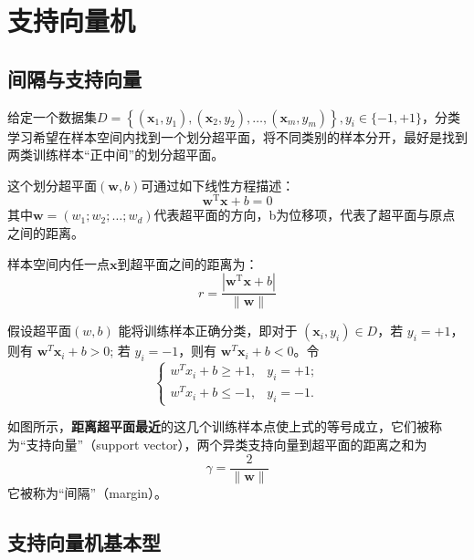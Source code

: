\chapter{支持向量机}

\section{间隔与支持向量}\label{sec:4.1}

给定一个数据集$
D=\left\{\left(\boldsymbol{x}_{1}, y_{1}\right),\left(\boldsymbol{x}_{2}, y_{2}\right), \ldots,\left(\boldsymbol{x}_{m}, y_{m}\right)\right\}, y_{i} \in\{-1,+1\}$，分类学习希望在样本空间内找到一个划分超平面，将不同类别的样本分开，最好是找到两类训练样本“正中间”的划分超平面。


这个划分超平面$(\boldsymbol w, b )$可通过如下线性方程描述：\[
\boldsymbol{w}^\mathrm{T}\boldsymbol{x}+b = 0
\]其中$ \boldsymbol{w}=\left(w_{1} ; w_{2} ; \ldots ; w_{d}\right) $代表超平面的方向，b为位移项，代表了超平面与原点之间的距离。

样本空间内任一点$\boldsymbol x$到超平面之间的距离为：\[
r=\frac{\left|\boldsymbol{w}^{\mathrm{T}} \boldsymbol{x}+b\right|}{\|\boldsymbol{w}\|}
\]


假设超平面$(w, b)$ 能将训练样本正确分类，即对于 $ (\boldsymbol x_i, y_i) \in D $，若 $ y_i = +1 $，则有 $ \boldsymbol w^T \boldsymbol x_i + b > 0 $; 若 $ y_i = -1 $，则有 $ \boldsymbol w^T \boldsymbol x_i + b < 0 $。令
\[
\begin{cases}
w^T x_i + b \geq +1, & y_i = +1; \\
w^T x_i + b \leq -1, & y_i = -1.
\end{cases}
\]

\begin{figure}[!htbp]
	\centering
\end{figure}

如图所示，\textbf{距离超平面最近}的这几个训练样本点使上式的等号成立，它们被称为“支持向量”（support vector），两个异类支持向量到超平面的距离之和为
\[
\gamma = \frac{2}{\|\boldsymbol w\|}
\]
它被称为“间隔”（margin）。

\section{支持向量机基本型}\label{sec:4.2}

